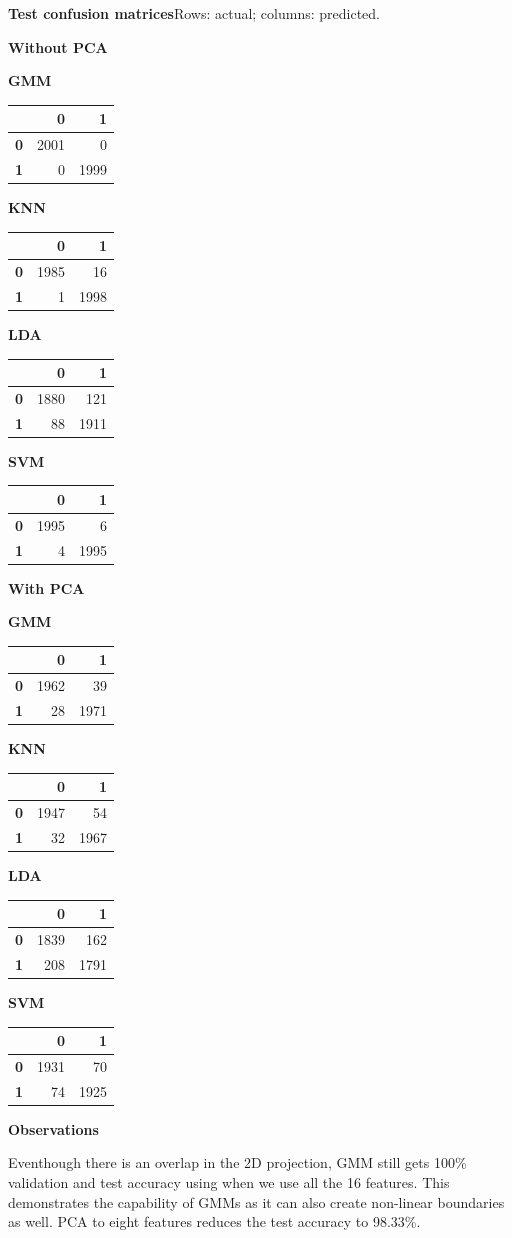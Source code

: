 \documentclass[11pt,a4paper]{article}
\makeatletter
\renewcommand{\arraystretch}{1.12}
\newcommand{\sectiongap}{\par\vspace{9mm}}
\newcommand{\confusion}[3]{%
  \begin{minipage}[t]{0.24\linewidth}
  \setlength{\parskip}{0pt}\centering
  \textbf{#1}\par\vspace{4pt}
  {\normalsize\setlength{\tabcolsep}{2.5pt}%
  \renewcommand{\arraystretch}{1.02}%
  \begin{tabular}{r@{\quad}#2}\toprule
  #3
  \bottomrule\end{tabular}}
  \end{minipage}}
\makeatother
\begin{document}
\noindent\begin{minipage}{\linewidth}
\textbf{Test confusion matrices}\hfill{\footnotesize Rows: actual; columns: predicted.}\par\smallskip
\textbf{Without PCA}\par\smallskip
\confusion{GMM}{rr}{
 & \textbf{0} & \textbf{1} \\ \midrule
\textbf{0} & 2001 & 0 \\
\textbf{1} & 0 & 1999 \\
}\hfill
\confusion{KNN}{rr}{
 & \textbf{0} & \textbf{1} \\ \midrule
\textbf{0} & 1985 & 16 \\
\textbf{1} & 1 & 1998 \\
}\hfill
\confusion{LDA}{rr}{
 & \textbf{0} & \textbf{1} \\ \midrule
\textbf{0} & 1880 & 121 \\
\textbf{1} & 88 & 1911 \\
}\hfill
\confusion{SVM}{rr}{
 & \textbf{0} & \textbf{1} \\ \midrule
\textbf{0} & 1995 & 6 \\
\textbf{1} & 4 & 1995 \\
}
\par\medskip
\textbf{With PCA}\par\smallskip
\confusion{GMM}{rr}{
 & \textbf{0} & \textbf{1} \\ \midrule
\textbf{0} & 1962 & 39 \\
\textbf{1} & 28 & 1971 \\
}\hfill
\confusion{KNN}{rr}{
 & \textbf{0} & \textbf{1} \\ \midrule
\textbf{0} & 1947 & 54 \\
\textbf{1} & 32 & 1967 \\
}\hfill
\confusion{LDA}{rr}{
 & \textbf{0} & \textbf{1} \\ \midrule
\textbf{0} & 1839 & 162 \\
\textbf{1} & 208 & 1791 \\
}\hfill
\confusion{SVM}{rr}{
 & \textbf{0} & \textbf{1} \\ \midrule
\textbf{0} & 1931 & 70 \\
\textbf{1} & 74 & 1925 \\
}
\sectiongap
\textbf{Observations}\par

Eventhough there is an overlap in the 2D projection, GMM still gets 100\% validation and test accuracy using when we use all the 16 features. This demonstrates the capability of GMMs as it can also create non-linear boundaries as well. PCA to eight features reduces the test accuracy to 98.33\%.

\end{minipage}\par\bigskip
\end{document}
